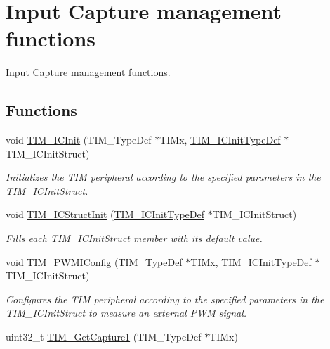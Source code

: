 \hypertarget{group___t_i_m___group3}{\section{Input Capture management functions}
\label{group___t_i_m___group3}
}


Input Capture management functions.  


\subsection*{Functions}
\begin{DoxyCompactItemize}
\item 
void \hyperlink{group___t_i_m___group3_ga9e6a153dd6552e4e1188eba227316f7f}{T\-I\-M\-\_\-\-I\-C\-Init} (T\-I\-M\-\_\-\-Type\-Def $\ast$T\-I\-Mx, \hyperlink{struct_t_i_m___i_c_init_type_def}{T\-I\-M\-\_\-\-I\-C\-Init\-Type\-Def} $\ast$T\-I\-M\-\_\-\-I\-C\-Init\-Struct)
\begin{DoxyCompactList}\small\item\em Initializes the T\-I\-M peripheral according to the specified parameters in the T\-I\-M\-\_\-\-I\-C\-Init\-Struct. \end{DoxyCompactList}\item 
void \hyperlink{group___t_i_m___group3_ga5005dac8e4e8a4c7fc2a0ef05b77cc50}{T\-I\-M\-\_\-\-I\-C\-Struct\-Init} (\hyperlink{struct_t_i_m___i_c_init_type_def}{T\-I\-M\-\_\-\-I\-C\-Init\-Type\-Def} $\ast$T\-I\-M\-\_\-\-I\-C\-Init\-Struct)
\begin{DoxyCompactList}\small\item\em Fills each T\-I\-M\-\_\-\-I\-C\-Init\-Struct member with its default value. \end{DoxyCompactList}\item 
void \hyperlink{group___t_i_m___group3_gaa71f9296556310f85628d6c748a06475}{T\-I\-M\-\_\-\-P\-W\-M\-I\-Config} (T\-I\-M\-\_\-\-Type\-Def $\ast$T\-I\-Mx, \hyperlink{struct_t_i_m___i_c_init_type_def}{T\-I\-M\-\_\-\-I\-C\-Init\-Type\-Def} $\ast$T\-I\-M\-\_\-\-I\-C\-Init\-Struct)
\begin{DoxyCompactList}\small\item\em Configures the T\-I\-M peripheral according to the specified parameters in the T\-I\-M\-\_\-\-I\-C\-Init\-Struct to measure an external P\-W\-M signal. \end{DoxyCompactList}\item 
uint32\-\_\-t \hyperlink{group___t_i_m___group3_ga6bd39ca543305ff0cd06fce0f678d94d}{T\-I\-M\-\_\-\-Get\-Capture1} (T\-I\-M\-\_\-\-Type\-Def $\ast$T\-I\-Mx)

\end{DoxyCompactItemize}
